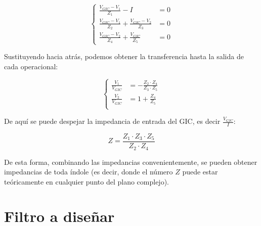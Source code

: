 \documentclass[../../tc_tp3_main.tex]{subfiles}
\begin{document}
 \[
	\left\{
 	\begin{aligned}
		 \frac{V_{GIC} - V_1}{Z_1} - I &= 0\\
		\frac{V_{GIC} - V_1}{Z_2} + \frac{V_{GIC} - V_2}{Z_3} &= 0 \\ 
		\frac{V_{GIC} - V_2}{Z_4} + \frac{V_{GIC}}{Z_5} &= 0
	\end{aligned}
	\right.
 \]
 
 Sustituyendo hacia atr\'as, podemos obtener la transferencia hasta la salida de cada operacional:
 
\begin{equation}
	\label{eq:1-v1v2g}
	\left\{
 	\begin{aligned}
		\frac{V_1}{V_{GIC}} & =  -\frac{Z_2 \cdot Z_4}{Z_3 \cdot Z_5}\\
		\frac{V_2}{V_{GIC}} & =  1+ \frac{Z_4}{Z_5} \\ 
	\end{aligned}
	\right.
 \end{equation}
 
 
 
 De aqu\'i se puede despejar la impedancia de entrada del GIC, es decir $\frac{V_{GIC}}{I}$:
 
 \begin{equation}
 	\label{eq:1-z-gic-g}
 	Z = \frac{Z_1 \cdot Z_3 \cdot Z_5}{Z_2 \cdot Z_4}
 \end{equation}

De esta forma, combinando las impedancias convenientemente, se pueden obtener impedancias de toda \'indole (es decir, donde el n\'umero $Z$ puede estar te\'oricamente en cualquier punto del plano complejo). 





\section{Filtro a dise\~nar}
\end{document}
